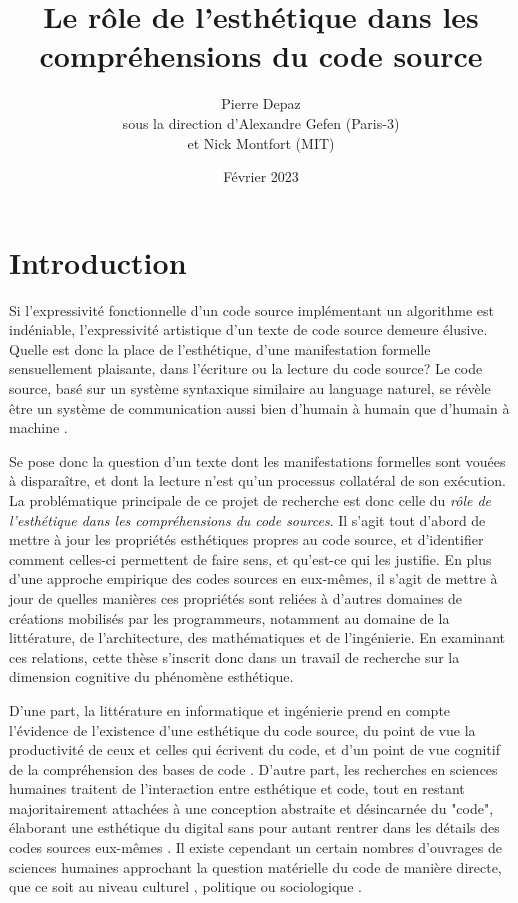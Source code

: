 \documentclass{article}
\begin{document}
\title{Le rôle de l'esthétique dans les compréhensions du code source}
\author{Pierre Depaz\\sous la direction d'Alexandre Gefen (Paris-3)\\et Nick Montfort (MIT)}
\date{Février 2023}
\maketitle

\section{Introduction}

Si l'expressivité fonctionnelle d'un code source implémentant un algorithme est indéniable, l'expressivité artistique d'un texte de code source demeure élusive. Quelle est donc la place de l'esthétique, d'une manifestation formelle sensuellement plaisante, dans l'écriture ou la lecture du code source? Le code source, basé sur un système syntaxique similaire au language naturel, se révèle être un système de communication aussi bien d'humain à humain que d'humain à machine \citep{abelson_structure_1979}.

Se pose donc la question d'un texte dont les manifestations formelles sont vouées à disparaître, et dont la lecture n'est qu'un processus collatéral de son exécution. La problématique principale de ce projet de recherche est donc celle du \emph{rôle de l'esthétique dans les compréhensions du code sources}. Il s'agit tout d'abord de mettre à jour les propriétés esthétiques propres au code source, et d'identifier comment celles-ci permettent de faire sens, et qu'est-ce qui les justifie. En plus d'une approche empirique des codes sources en eux-mêmes, il s'agit de mettre à jour de quelles manières ces propriétés sont reliées à d'autres domaines de créations mobilisés par les programmeurs, notamment au domaine de la littérature, de l'architecture, des mathématiques et de l'ingénierie. En examinant ces relations, cette thèse s'inscrit donc dans un travail de recherche sur la dimension cognitive du phénomène esthétique.

D'une part, la littérature en informatique et ingénierie prend en compte l'évidence de l'existence d'une esthétique du code source, du point de vue la productivité de ceux et celles qui écrivent du code, et d'un point de vue cognitif de la compréhension des bases de code \citep{oram_beautiful_2007,cox_programming_2009,gabriel_mob_2001,martin_clean_2008,detienne_software_2012,weinberg_psychology_1998}. D'autre part, les recherches en sciences humaines traitent de l'interaction entre esthétique et code, tout en restant majoritairement attachées à une conception abstraite et désincarnée du "code", élaborant une esthétique du digital sans pour autant rentrer dans les détails des codes sources eux-mêmes \citep{cramer_exe_2019,hayles_my_2010,mackenzie_cutting_2006,levy_programmation_1992}. Il existe cependant un certain nombres d'ouvrages de sciences humaines approchant la question matérielle du code de manière directe, que ce soit au niveau culturel \citep{montfort_10_2014}, politique \citep{cox_speaking_2013} ou sociologique \citep{paloque-berges_poetique_2009}.
\end{document}
